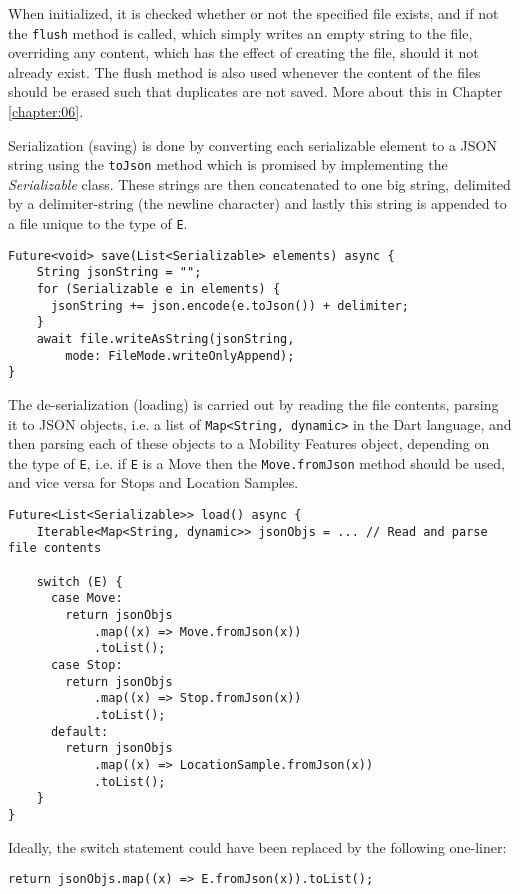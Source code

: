 When initialized, it is checked whether or not the specified file exists, and if not the \verb|flush| method is called, which simply writes an empty string to the file, overriding any content, which has the effect of creating the file, should it not already exist. The flush method is also used whenever the content of the files should be erased such that duplicates are not saved. More about this in Chapter \ref{chapter:06}.

Serialization (saving) is done by converting each serializable element to a JSON string using the \verb|toJson| method which is promised by implementing the \textit{Serializable} class. These strings are then concatenated to one big string, delimited by a delimiter-string (the newline character) and lastly this string is appended to a file unique to the type of \verb|E|.

\begin{verbatim}
Future<void> save(List<Serializable> elements) async {
    String jsonString = "";
    for (Serializable e in elements) {
      jsonString += json.encode(e.toJson()) + delimiter;
    }
    await file.writeAsString(jsonString, 
        mode: FileMode.writeOnlyAppend);
}
\end{verbatim}

The de-serialization (loading) is carried out by reading the file contents, parsing it to JSON objects, i.e. a list of \verb|Map<String, dynamic>| in the Dart language, and then parsing each of these objects to a Mobility Features object, depending on the type of \verb|E|, i.e. if \verb|E| is a Move then the \verb|Move.fromJson| method should be used, and vice versa for Stops and Location Samples. 

\begin{verbatim}
Future<List<Serializable>> load() async {
    Iterable<Map<String, dynamic>> jsonObjs = ... // Read and parse file contents
    
    switch (E) {
      case Move:
        return jsonObjs
            .map((x) => Move.fromJson(x))
            .toList();
      case Stop:
        return jsonObjs
            .map((x) => Stop.fromJson(x))
            .toList();
      default:
        return jsonObjs
            .map((x) => LocationSample.fromJson(x))
            .toList();
    }
}
\end{verbatim}

Ideally, the switch statement could have been replaced by the following one-liner:
\begin{verbatim}
return jsonObjs.map((x) => E.fromJson(x)).toList();
\end{verbatim}

